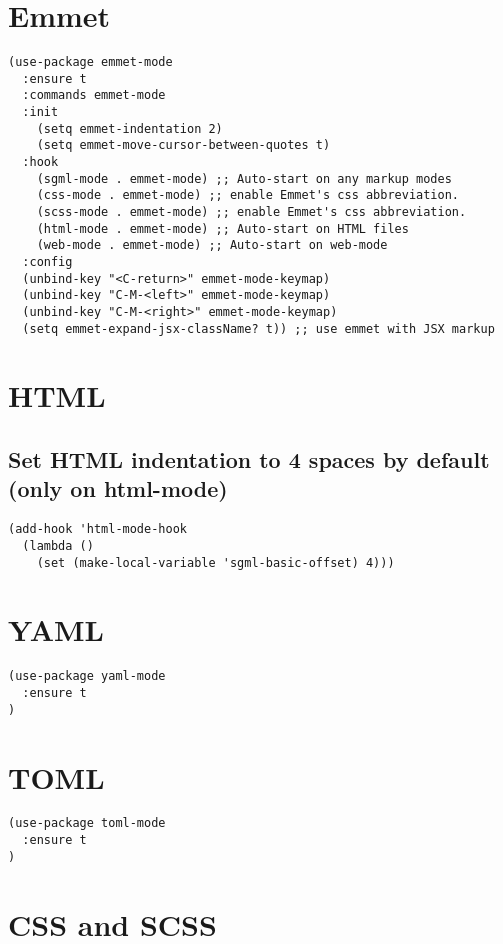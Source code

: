 \documentclass[11pt]{article}
\begin{document}
\section*{Emmet}
\label{sec:org204d6c3}

\begin{verbatim}
(use-package emmet-mode
  :ensure t
  :commands emmet-mode
  :init
    (setq emmet-indentation 2)
    (setq emmet-move-cursor-between-quotes t)
  :hook
    (sgml-mode . emmet-mode) ;; Auto-start on any markup modes
    (css-mode . emmet-mode) ;; enable Emmet's css abbreviation.
    (scss-mode . emmet-mode) ;; enable Emmet's css abbreviation.
    (html-mode . emmet-mode) ;; Auto-start on HTML files
    (web-mode . emmet-mode) ;; Auto-start on web-mode
  :config
  (unbind-key "<C-return>" emmet-mode-keymap)
  (unbind-key "C-M-<left>" emmet-mode-keymap)
  (unbind-key "C-M-<right>" emmet-mode-keymap)
  (setq emmet-expand-jsx-className? t)) ;; use emmet with JSX markup
\end{verbatim}

\section*{HTML}
\label{sec:org7090190}

\subsection*{Set HTML indentation to 4 spaces by default (only on html-mode)}
\label{sec:orge632ee1}
\begin{verbatim}
(add-hook 'html-mode-hook
  (lambda ()
    (set (make-local-variable 'sgml-basic-offset) 4)))
\end{verbatim}

\section*{YAML}
\label{sec:org6c32408}
\begin{verbatim}
(use-package yaml-mode
  :ensure t
)
\end{verbatim}

\section*{TOML}
\label{sec:orgf3997ae}
\begin{verbatim}
(use-package toml-mode
  :ensure t
)
\end{verbatim}

\section*{CSS and SCSS}
\label{sec:org00ef89c}
\end{document}
